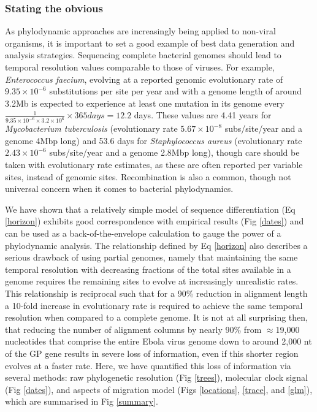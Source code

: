 \documentclass[11pt,oneside,letterpaper]{article}
\begin{document}
\subsubsection*{Stating the obvious}

As phylodynamic approaches are increasingly being applied to non-viral organisms, it is important to set a good example of best data generation and analysis strategies.
Sequencing complete bacterial genomes should lead to temporal resolution values comparable to those of viruses.
For example, \textit{Enterococcus faecium}, evolving at a reported genomic evolutionary rate of $9.35 \times 10^{-6}$ substitutions per site per year \citep{duchene_genome-scale_2016} and with a genome length of around 3.2Mb is expected to experience at least one mutation in its genome every $\frac{1}{9.35 \times 10^{-6} \times 3.2 \times 10^{6}} \times 365 days = 12.2$ days.
These values are 4.41 years for \textit{Mycobacterium tuberculosis} (evolutionary rate $5.67 \times 10^{-8}$ subs/site/year \citep{duchene_genome-scale_2016} and a genome 4Mbp long) and 53.6 days for \textit{Staphylococcus aureus} (evolutionary rate $2.43 \times 10^{-6}$ subs/site/year \citep{duchene_genome-scale_2016} and a genome 2.8Mbp long), though care should be taken with evolutionary rate estimates, as these are often reported per variable sites, instead of genomic sites.
Recombination is also a common, though not universal concern when it comes to bacterial phylodynamics.

We have shown that a relatively simple model of sequence differentiation (Eq \ref{horizon}) exhibits good correspondence with empirical results (Fig \ref{dates}) and can be used as a back-of-the-envelope calculation to gauge the power of a phylodynamic analysis.
The relationship defined by Eq \ref{horizon} also describes a serious drawback of using partial genomes, namely that maintaining the same temporal resolution with decreasing fractions of the total sites available in a genome requires the remaining sites to evolve at increasingly unrealistic rates.
This relationship is reciprocal such that for a 90\% reduction in alignment length a 10-fold increase in evolutionary rate is required to achieve the same temporal resolution when compared to a complete genome.
It is not at all surprising then, that reducing the number of alignment columns by nearly 90\% from $\approx$19,000 nucleotides that comprise the entire Ebola virus genome down to around 2,000 nt of the GP gene results in severe loss of information, even if this shorter region evolves at a faster rate.
Here, we have quantified this loss of information via several methods: raw phylogenetic resolution (Fig \ref{trees}), molecular clock signal (Fig \ref{dates}), and aspects of migration model (Figs \ref{locations}, \ref{trace}, and \ref{glm}), which are summarised in Fig \ref{summary}.
\end{document}
